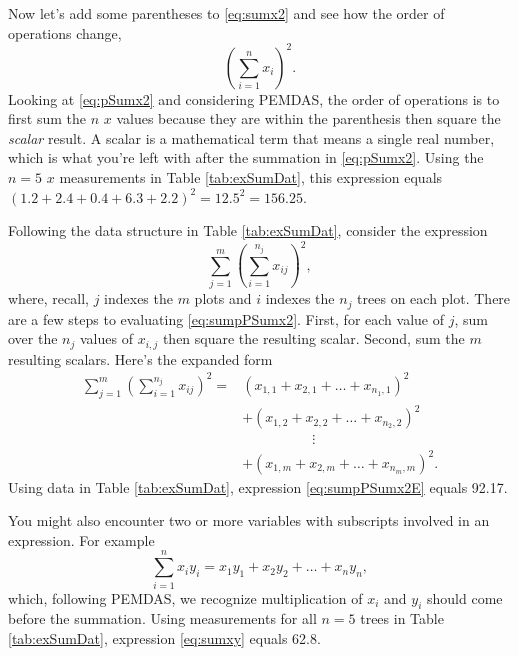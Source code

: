 \documentclass[
  11pt,
]{krantz}
\theoremstyle{definition}
\theoremstyle{definition}
\theoremstyle{definition}
\theoremstyle{definition}
\theoremstyle{remark}
\begin{document}
Now let's add some parentheses to \eqref{eq:sumx2} and see how the order of operations change,
\begin{equation} 
\left(\sum^n_{i=1}x_i\right)^2.
\label{eq:pSumx2}
\end{equation}
Looking at \eqref{eq:pSumx2} and considering PEMDAS, the order of operations is to first sum the \(n\) \(x\) values because they are within the parenthesis then square the \emph{scalar} result. A scalar is a mathematical term that means a single real number, which is what you're left with after the summation in \eqref{eq:pSumx2}. Using the \(n = 5\) \(x\) measurements in Table \ref{tab:exSumDat}, this expression equals \((1.2 + 2.4 + 0.4 + 6.3 + 2.2)^2 = 12.5^2 = 156.25\).

Following the data structure in Table \ref{tab:exSumDat}, consider the expression
\begin{equation} 
\sum^m_{j=1}\left(\sum^{n_j}_{i=1}x_{ij}\right)^2,
\label{eq:sumpPSumx2}
\end{equation}
where, recall, \(j\) indexes the \(m\) plots and \(i\) indexes the \(n_j\) trees on each plot. There are a few steps to evaluating \eqref{eq:sumpPSumx2}. First, for each value of \(j\), sum over the \(n_j\) values of \(x_{i,j}\) then square the resulting scalar. Second, sum the \(m\) resulting scalars. Here's the expanded form
\begin{align}
\sum^m_{j=1}\left(\sum^{n_j}_{i=1}x_{ij}\right)^2= &\left(x_{1,1}+x_{2,1}+\ldots+x_{n_1,1}\right)^2\nonumber\\
                                               &+\left(x_{1,2}+x_{2,2}+\ldots+x_{n_2,2}\right)^2\nonumber\\
                                               &\quad\quad\quad\quad\quad\vdots\nonumber\\
                                               &+\left(x_{1,m}+x_{2,m}+\ldots+x_{n_m,m}\right)^2.
\label{eq:sumpPSumx2E}
\end{align}
Using data in Table \ref{tab:exSumDat}, expression \eqref{eq:sumpPSumx2E} equals 92.17.

You might also encounter two or more variables with subscripts involved in an expression. For example
\begin{equation} 
\sum^n_{i=1}x_iy_i = x_1y_1 + x_2y_2 + \ldots + x_ny_n,
\label{eq:sumxy}
\end{equation}
which, following PEMDAS, we recognize multiplication of \(x_i\) and \(y_i\) should come before the summation. Using measurements for all \(n = 5\) trees in Table \ref{tab:exSumDat}, expression \eqref{eq:sumxy} equals 62.8.
\end{document}
